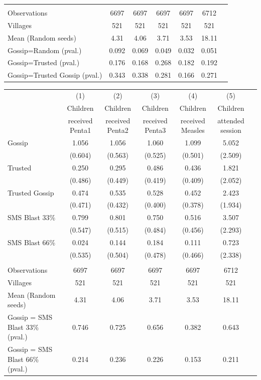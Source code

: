 \begin{table}[!h]
{\begin{threeparttable}
\begin{tabular}{lcccccc}
&&&&&\\
Observations     & 6697 & 6697 & 6697 & 6697 & 6712           \\
Villages & 521 & 521 & 521 & 521 & 521\\
Mean (Random seeds)   			& 4.31 & 4.06 & 3.71 & 3.53 & 18.11        \\
Gossip=Random (pval.) & 0.092 & 0.069 & 0.049 & 0.032 & 0.051\\
Gossip=Trusted (pval.) & 0.176 & 0.168 & 0.268 & 0.182 & 0.192           \\
Gossip=Trusted Gossip (pval.)  & 0.343 & 0.338 & 0.281 & 0.166 & 0.271          \\
\hline 
\end{tabular}
		\begin{tabular}{lcccccc} \hline
	& (1) & (2) & (3) & (4) & (5) \\
	& Children & Children & Children & Children& Children \\
	 &received Penta1 &  received Penta2 &  received Penta3 &  received Measles & attended session\\ \hline    
 Gossip & 1.056 & 1.056 & 1.060 & 1.099& 5.052 \\ 
  & (0.604) & (0.563) & (0.525) & (0.501) & (2.509) \\ 
 Trusted & 0.250 & 0.295 & 0.486 & 0.436 & 1.821 \\ 
  & (0.486) & (0.449) & (0.419) & (0.409) & (2.052) \\ 
 Trusted Gossip & 0.474 & 0.535 & 0.528 & 0.452 & 2.423 \\ 
  & (0.471) & (0.432) & (0.400) & (0.378) & (1.934) \\ 
 SMS Blast 33\% & 0.799 & 0.801 & 0.750 & 0.516 & 3.507 \\ 
  & (0.547) & (0.515) & (0.484) & (0.456) & (2.293) \\ 
 SMS Blast 66\% & 0.024 & 0.144 & 0.184 & 0.111 & 0.723 \\ 
  & (0.535) & (0.504) & (0.478) & (0.466) & (2.338) \\ 
  & & & & & \\ 
Observations     & 6697 & 6697 & 6697 & 6697 & 6712           \\
Villages & 521 & 521 & 521 & 521 & 521\\
Mean (Random seeds)   			& 4.31 & 4.06 & 3.71 & 3.53 & 18.11        \\
 Gossip = SMS Blast 33\% (pval.) & 0.746 &0.725 &0.656 &0.382 & 0.643\\
 Gossip = SMS Blast 66\% (pval.) & 0.214 & 0.236 & 0.226& 0.153&0.211\\

\end{tabular}
\end{threeparttable}}
\end{table}
